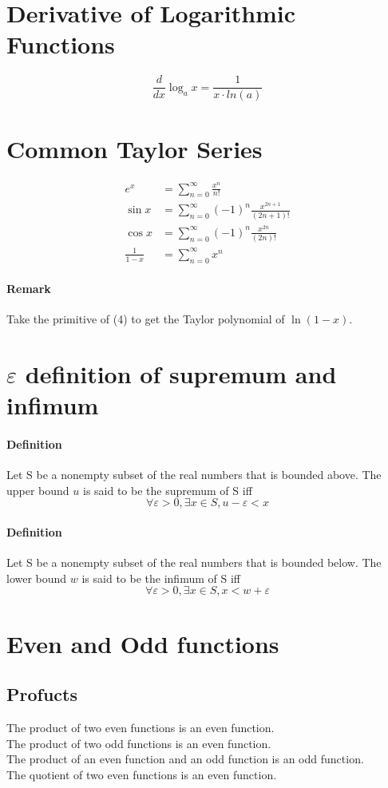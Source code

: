 \documentclass[11pt]{article}
\begin{document}
\section{Derivative of Logarithmic Functions}
$$\frac{d}{dx}\log_a{x} = \frac{1}{x \cdot ln(a)}$$

\section{Common Taylor Series}
\begin{align}
	e^x &= \sum_{n=0}^{\infty}\frac{x^n}{n!}\\
	\sin{x} &= \sum_{n=0}^{\infty}(-1)^n\frac{x^{2n+1}}{(2n+1)!}\\
	\cos{x} &= \sum_{n=0}^{\infty}(-1)^n\frac{x^{2n}}{(2n)!}\\
	\frac{1}{1-x} &= \sum_{n=0}^{\infty}x^n
\end{align}
\paragraph{Remark}
Take the primitive of (4) to get the Taylor polynomial of $\ln(1-x)$.
\section{$\varepsilon$ definition of supremum and infimum}
\paragraph{Definition} Let S be a nonempty subset of the real numbers that is bounded above. The upper bound $u$ is said to be the supremum of S iff $$\forall \varepsilon >0, \exists x \in S, u - \varepsilon < x$$
\paragraph{Definition} Let S be a nonempty subset of the real numbers that is bounded below. The lower bound $w$ is said to be the infimum of S iff $$\forall \varepsilon >0, \exists x \in S, x < w + \varepsilon$$
\section{Even and Odd functions}
\subsection{Profucts}
The product of two even functions is an even function. \\
The product of two odd functions is an even function. \\
The product of an even function and an odd function is an odd function.\\
The quotient of two even functions is an even function.
\end{document}

